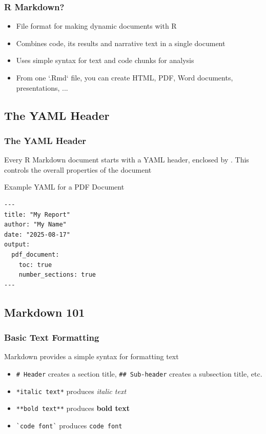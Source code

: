 \documentclass[aspectratio=169]{beamer}\usepackage[]{graphicx}\usepackage[]{xcolor}
\begin{document}
\begin{frame}
  \frametitle{R Markdown?}
  \begin{itemize}
    \item File format for making dynamic documents with R
    \vfill
    \item Combines code, its results and narrative text in a single document
    \vfill
    \item Uses simple  syntax for text and  code chunks for analysis
    \vfill
    \item From one `.Rmd` file, you can create HTML, PDF, Word documents, presentations, ...
  \end{itemize}
\end{frame}

\subsection{The YAML Header}

\begin{frame}[fragile]
  \frametitle{The YAML Header}
Every R Markdown document starts with a YAML header, enclosed by \code{---}. This controls the overall properties of the document
\begin{block}{Example YAML for a PDF Document}
\begin{verbatim}
---
title: "My Report"
author: "My Name"
date: "2025-08-17"
output:
  pdf_document:
    toc: true
    number_sections: true
---
\end{verbatim}
\end{block}
\end{frame}

\subsection{Markdown 101}

\begin{frame}[fragile]
  \frametitle{Basic Text Formatting}
  Markdown provides a simple syntax for formatting text
  \vfill
  \begin{itemize}
    \item \verb|# Header| creates a section title, \verb|## Sub-header| creates a subsection title, etc.
    \vfill
    \item \verb|*italic text*| produces \textit{italic text}
    \vfill
    \item \verb|**bold text**| produces \textbf{bold text}
    \vfill
    \item \verb|`code font`| produces \texttt{code font}
  \end{itemize}
\end{frame}
\end{document}
